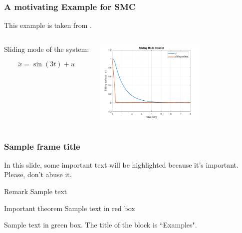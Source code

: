 \begin{frame}
  \frametitle{A motivating Example for SMC}

  This example is taken from \cite{utkin2020}.
  
 \begin{columns}

   \begin{example}
     Sliding mode of the system:

      \begin{equation}
         \ddot x = \sin(3 t) + u 
       \end{equation}
    \end{example}   
   \centering
    \includegraphics[height=4cm]{./pictures/SMCutkinRoadmap.pdf}
\end{columns}
 \end{frame}



 \begin{frame}
\frametitle{Sample frame title}

In this slide, some important text will be
\alert{highlighted} because it's important.
Please, don't abuse it.

\begin{block}{Remark}
Sample text
\end{block}

\begin{alertblock}{Important theorem}
Sample text in red box
\end{alertblock}

\begin{examples}
Sample text in green box. The title of the block is ``Examples".
\end{examples}
\end{frame}




 
